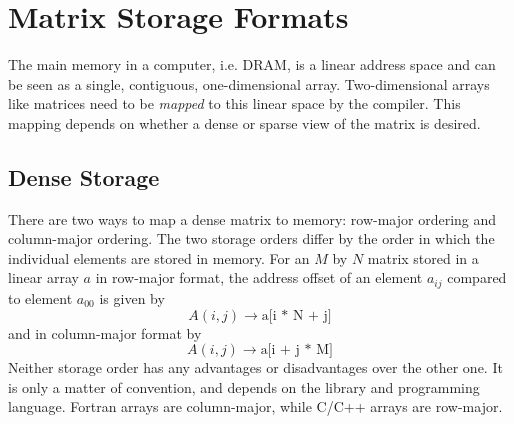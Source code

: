 %
%
%
%

\section{Matrix Storage Formats}

The main memory in a computer, i.e. DRAM, is a linear address space and can be seen as a single, contiguous, one-dimensional array. Two-dimensional arrays like matrices need to be \emph{mapped} to this linear space by the compiler. This mapping depends on whether a dense or sparse view of the matrix is desired. 

\subsection{Dense Storage}

There are two ways to map a dense matrix to memory: row-major ordering and column-major ordering. The two storage orders differ by the order in which the individual elements are stored in memory. For an $M$ by $N$ matrix stored in a linear array $a$ in row-major format, the address offset of an element $a_{ij}$ compared to element $a_{00}$ is given by
\begin{equation}
A(i,j) \rightarrow \text{a[i * N + j]}
\end{equation}
\noindent and in column-major format by
\begin{equation}
A(i,j) \rightarrow \text{a[i + j * M]}
\end{equation}
Neither storage order has any advantages or disadvantages over the other one. It is only a matter of convention, and depends on the library and programming language. Fortran arrays are column-major, while C/C++ arrays are row-major. 

